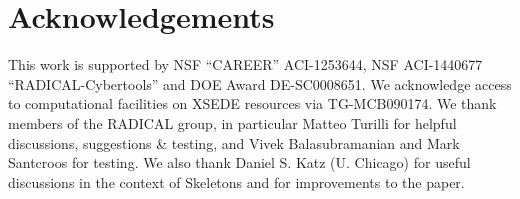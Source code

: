 \documentclass[10pt, conference, compsocconf]{IEEEtran}
\begin{document}
\section*{Acknowledgements}

\footnotesize{This work is supported by NSF ``CAREER'' ACI-1253644, NSF
  ACI-1440677 ``RADICAL-Cybertools'' and DOE Award DE-SC0008651. We acknowledge
  access to computational facilities on XSEDE resources via TG-MCB090174. We
  thank members of the RADICAL group, in particular Matteo Turilli for helpful
  discussions, suggestions \& testing, and Vivek Balasubramanian and Mark
  Santcroos for testing. We also thank Daniel S. Katz (U. Chicago) for useful
  discussions in the context of Skeletons and for improvements to the paper.}







\end{document}
